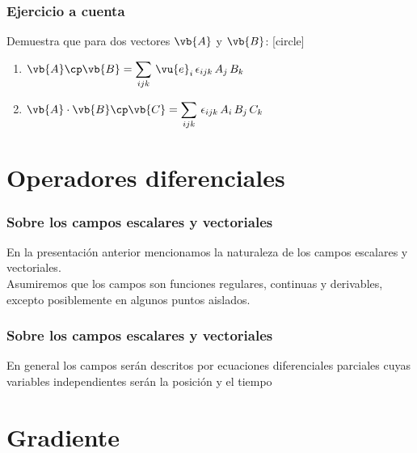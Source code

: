 \begin{frame}
\frametitle{Ejercicio a cuenta}
Demuestra que para dos vectores $\vb{A}$ y $\vb{B}$:
[circle]
\begin{enumerate}
\item $\vb{A} \cp \vb{B} = \displaystyle \sum_{ijk} \, \vu{e}_{i} \, \epsilon_{ijk} \, A_{j} \, B_{k}$ \\[1em]
\item $\vb{A} \cdot \vb{B} \cp \vb{C} = \displaystyle \sum_{ijk} \, \epsilon_{ijk} \, A_{i} \, B_{j} \, C_{k}$
\end{enumerate}
\end{frame}
\section{Operadores diferenciales}
\begin{frame}
\frametitle{Sobre los campos escalares y vectoriales}
En la presentación anterior mencionamos la naturaleza de los campos escalares y vectoriales.
\\
\bigskip
\pause
Asumiremos que los campos son funciones regulares, continuas y derivables, excepto posiblemente en algunos puntos aislados.
\end{frame}
\begin{frame}
\frametitle{Sobre los campos escalares y vectoriales}
En general los campos serán descritos por ecuaciones diferenciales parciales cuyas variables independientes serán la posición y el tiempo
\end{frame}
\section{Gradiente}
